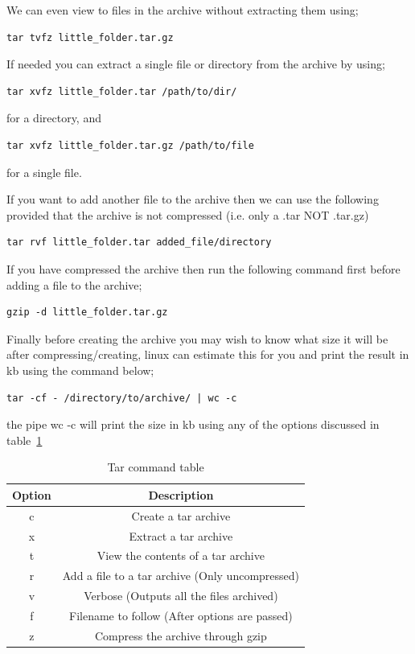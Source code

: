 We can even view to files in the archive without extracting them using;

\begin{lstlisting}
tar tvfz little_folder.tar.gz
\end{lstlisting}

If needed you can extract a single file or directory from the archive by using;

\begin{lstlisting}
tar xvfz little_folder.tar /path/to/dir/
\end{lstlisting}

for a directory, and

\begin{lstlisting}
tar xvfz little_folder.tar.gz /path/to/file
\end{lstlisting}

for a single file.

If you want to add another file to the archive then we can use the following provided that the archive is not compressed (i.e. only a .tar NOT .tar.gz)

\begin{lstlisting}
tar rvf little_folder.tar added_file/directory
\end{lstlisting}

If you have compressed the archive then run the following command first before adding a file to the archive;

\begin{lstlisting}
gzip -d little_folder.tar.gz
\end{lstlisting}

Finally before creating the archive you may wish to know what size it will be after compressing/creating, linux can estimate this for you and print the result in kb using the command below;

\begin{lstlisting}
tar -cf - /directory/to/archive/ | wc -c
\end{lstlisting}

the pipe wc -c will print the size in kb using any of the options discussed in table~\ref{tab:tar}

\begin{table}[!th]
\centering
\begin{tabular}{cc}
\hline
Option & Description\\
\hline
c & Create a tar archive\\
x & Extract a tar archive\\
t & View the contents of a tar archive\\
r & Add a file to a tar archive (Only uncompressed)\\
\hline
v & Verbose (Outputs all the files archived)\\
f & Filename to follow (After options are passed)\\
z & Compress the archive through gzip\\
\hline
\end{tabular}
\caption{Tar command table}
\label{tab:tar}
\end{table}


